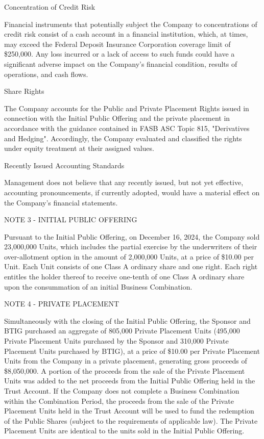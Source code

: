 \documentclass[11pt,a4paper]{article}
\begin{document}
Concentration of Credit Risk

Financial instruments that potentially subject the Company to concentrations of credit risk consist of a cash account in a financial institution, which, at times, may exceed the Federal Deposit Insurance Corporation coverage limit of \$250,000. Any loss incurred or a lack of access to such funds could have a significant adverse impact on the Company's financial condition, results of operations, and cash flows.

Share Rights

The Company accounts for the Public and Private Placement Rights issued in connection with the Initial Public Offering and the private placement in accordance with the guidance contained in FASB ASC Topic 815, "Derivatives and Hedging". Accordingly, the Company evaluated and classified the rights under equity treatment at their assigned values.

Recently Issued Accounting Standards

Management does not believe that any recently issued, but not yet effective, accounting pronouncements, if currently adopted, would have a material effect on the Company's financial statements.

NOTE 3 - INITIAL PUBLIC OFFERING

Pursuant to the Initial Public Offering, on December 16, 2024, the Company sold 23,000,000 Units, which includes the partial exercise by the underwriters of their over-allotment option in the amount of 2,000,000 Units, at a price of \$10.00 per Unit. Each Unit consists of one Class A ordinary share and one right. Each right entitles the holder thereof to receive one-tenth of one Class A ordinary share upon the consummation of an initial Business Combination.

NOTE 4 - PRIVATE PLACEMENT

Simultaneously with the closing of the Initial Public Offering, the Sponsor and BTIG purchased an aggregate of 805,000 Private Placement Units (495,000 Private Placement Units purchased by the Sponsor and 310,000 Private Placement Units purchased by BTIG), at a price of \$10.00 per Private Placement Units from the Company in a private placement, generating gross proceeds of \$8,050,000. A portion of the proceeds from the sale of the Private Placement Units was added to the net proceeds from the Initial Public Offering held in the Trust Account. If the Company does not complete a Business Combination within the Combination Period, the proceeds from the sale of the Private Placement Units held in the Trust Account will be used to fund the redemption of the Public Shares (subject to the requirements of applicable law). The Private Placement Units are identical to the units sold in the Initial Public Offering.
\end{document}
